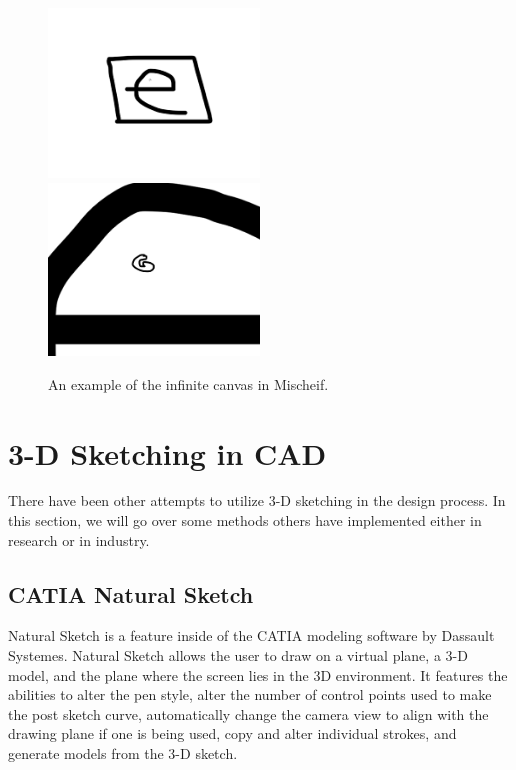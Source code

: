 \documentclass[11pt]{report}
\begin{document}
\begin{figure}
\includegraphics[width=0.5\textwidth]{infinitecanvas1}
\includegraphics[width=0.5\textwidth]{infinitecanvas2}
\caption{An example of the infinite canvas in Mischeif.}
\end{figure}

\section{3-D Sketching in CAD}

There have been other attempts to utilize 3-D sketching in the design process. In this section, we will go over some methods others have implemented either in research or in industry.

\subsection{CATIA Natural Sketch}

Natural Sketch is a feature inside of the CATIA modeling software by Dassault Systemes. 
Natural Sketch allows the user to draw on a virtual plane, a 3-D model, and the plane where the screen lies in the 3D environment. 
It features the abilities to alter the pen style, alter the number of control points used to make the post sketch curve, automatically change the camera view to align with the drawing plane if one is being used, copy and alter individual strokes, and generate models from the 3-D sketch.
\end{document}
